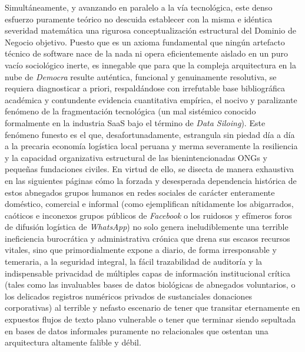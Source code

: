 Simultáneamente, y avanzando en paralelo a la vía tecnológica, este denso esfuerzo puramente teórico no descuida establecer con la misma e idéntica severidad matemática una rigurosa conceptualización estructural del Dominio de Negocio objetivo. Puesto que es un axioma fundamental que ningún artefacto técnico de software nace de la nada ni opera eficientemente aislado en un puro vacío sociológico inerte, es innegable que para que la compleja arquitectura en la nube de \textit{Democra} resulte auténtica, funcional y genuinamente resolutiva, se requiera diagnosticar a priori, respaldándose con irrefutable base bibliográfica académica y contundente evidencia cuantitativa empírica, el nocivo y paralizante fenómeno de la fragmentación tecnológica (un mal sistémico conocido formalmente en la industria SaaS bajo el término de \textit{Data Siloing}). Este fenómeno funesto es el que, desafortunadamente, estrangula sin piedad día a día a la precaria economía logística local peruana y merma severamente la resiliencia y la capacidad organizativa estructural de las bienintencionadas ONGs y pequeñas fundaciones civiles. En virtud de ello, se disecta de manera exhaustiva en las siguientes páginas cómo la forzada y desesperada dependencia histórica de estos abnegados grupos humanos en redes sociales de carácter enteramente doméstico, comercial e informal (como ejemplifican nítidamente los abigarrados, caóticos e inconexos grupos públicos de \textit{Facebook} o los ruidosos y efímeros foros de difusión logística de \textit{WhatsApp}) no solo genera ineludiblemente una terrible ineficiencia burocrática y administrativa crónica que drena sus escasos recursos vitales, sino que primordialmente expone a diario, de forma irresponsable y temeraria, a la seguridad integral, la fácil trazabilidad de auditoría y la indispensable privacidad de múltiples capas de información institucional crítica (tales como las invaluables bases de datos biológicas de abnegados voluntarios, o los delicados registros numéricos privados de sustanciales donaciones corporativas) al terrible y nefasto escenario de tener que transitar eternamente en expuestos flujos de texto plano vulnerable o tener que terminar siendo sepultada en bases de datos informales puramente no relacionales que ostentan una arquitectura altamente falible y débil.

